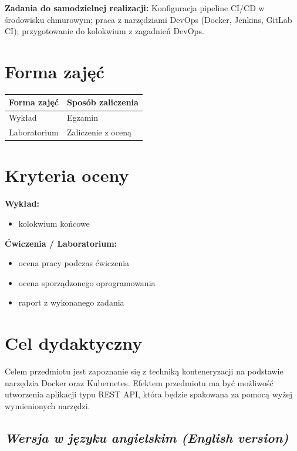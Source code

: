 \documentclass[12pt, a4paper]{article}
\newcommand{\thdrule}{\noalign{\global\setlength{\extrarowheight}{0pt}}}
\newcommand{\thdend}{\noalign{\global\setlength{\extrarowheight}{3pt}}}
\begin{document}
\vspace{4pt}
\noindent\textbf{Zadania do samodzielnej realizacji:} Konfiguracja pipeline CI/CD w środowisku chmurowym; praca z narzędziami DevOps (Docker, Jenkins, GitLab CI); przygotowanie do kolokwium z zagadnień DevOps.

\section{Forma zajęć}

\begin{center}
{\scriptsize
\begin{tabular}{m{5cm}m{8cm}}
\thdrule\toprule
\rowcolor{pjatkRed} {\color{white}\textbf{Forma zajęć}} & {\color{white}\textbf{Sposób zaliczenia}} \\
\midrule\thdend
  \rowcolor{tableRowLight} Wykład & Egzamin \\
  \rowcolor{tableRowAlt} Laboratorium & Zaliczenie z oceną \\
\bottomrule
\end{tabular}}
\end{center}

\section{Kryteria oceny}

\textbf{Wykład:}
\begin{itemize}
  \item kolokwium końcowe
\end{itemize}
\vspace{4pt}
\textbf{Ćwiczenia / Laboratorium:}
\begin{itemize}
  \item ocena pracy podczas ćwiczenia
  \item ocena sporządzonego oprogramowania
  \item raport z wykonanego zadania
\end{itemize}


\section{Cel dydaktyczny}

Celem przedmiotu jest zapoznanie się z techniką konteneryzacji na podstawie narzędzia Docker oraz Kubernetes. Efektem przedmiotu ma być możliwość utworzenia aplikacji typu REST API, która będzie spakowana za pomocą wyżej wymienionych narzędzi.

\subsection*{\textit{Wersja w języku angielskim (English version)}}
\end{document}
